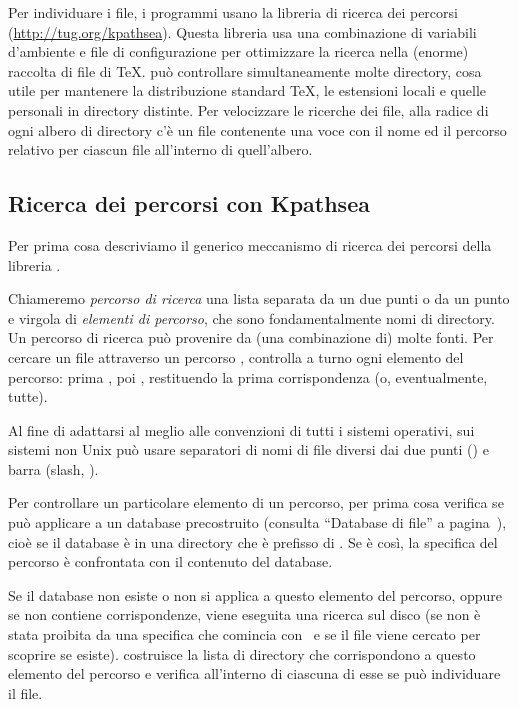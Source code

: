 \documentclass{article}
\begin{document}
Per individuare i file, i programmi \Webc{} usano la libreria di ricerca
dei percorsi \KPS{} (\url{http://tug.org/kpathsea}). Questa libreria usa
una combinazione di variabili d'ambiente e file di configurazione per
ottimizzare la ricerca nella (enorme) raccolta di file di \TeX{}. \Webc{}
può controllare simultaneamente molte directory, cosa utile per mantenere
la distribuzione standard \TeX{}, le estensioni locali e quelle personali
in directory distinte. Per velocizzare le ricerche dei file, alla radice
di ogni albero di directory c'è un file  contenente una voce
con il nome ed il percorso relativo per ciascun file all'interno di
quell'albero.


\subsection{Ricerca dei percorsi con Kpathsea}
\label{sec:kpathsea}

Per prima cosa descriviamo il generico meccanismo di ricerca dei percorsi
della libreria \KPS.

Chiameremo \emph{percorso di ricerca} una lista separata da un due punti o
da un punto e virgola di \emph{elementi di percorso}, che sono
fondamentalmente nomi di directory. Un percorso di ricerca può provenire
da (una combinazione di) molte fonti. Per cercare un file 
attraverso un percorso , \KPS{} controlla a turno ogni
elemento del percorso: prima , poi ,
restituendo la prima corrispondenza (o, eventualmente, tutte).

Al fine di adattarsi al meglio alle convenzioni di tutti i sistemi
operativi, sui sistemi non Unix \KPS{} può usare separatori di nomi di
file diversi dai due punti (\samp{:}) e barra (slash, \samp{/}).

Per controllare un particolare elemento  di un percorso, \KPS{} per
prima cosa verifica se può applicare a  un database precostruito
(consulta ``Database di file'' a pagina~\pageref{sec:filename-database}),
cioè se il database è in una directory che è prefisso di . Se è
così, la specifica del percorso è confrontata con il contenuto del
database.

Se il database non esiste o non si applica a questo elemento del percorso,
oppure se non contiene corrispondenze, viene eseguita una ricerca sul
disco (se non è stata proibita da una specifica che comincia con
\samp{!!}\ e se il file viene cercato per scoprire se esiste). \KPS{}
costruisce la lista di directory che corrispondono a questo elemento del
percorso e verifica all'interno di ciascuna di esse se può individuare il
file.
\end{document}
